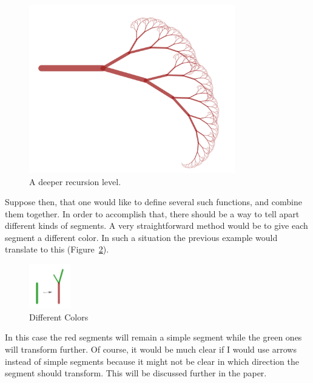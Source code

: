         \begin{figure}[ht]
            \caption{\label{simple03} A deeper recursion level.}
            \centering
            \includegraphics[width=0.8\textwidth]{img/simple03.png}
        \end{figure}

        \FloatBarrier

        Suppose then, that one would like to define several such functions, and combine them together.
        In order to accomplish that, there should be a way to tell apart different kinds of segments.
        A very straightforward method would be to give each segment a different color.
        In such a situation the previous example would translate to this (Figure~\ref{med01}).

        \begin{figure}[ht]
            \caption{\label{med01} Different Colors}
            \centering
            \includegraphics[width=0.16\textwidth]{img/med01.png}
        \end{figure}

        \FloatBarrier

        In this case the red segments will remain a simple segment while the green ones will transform further.
        Of course, it would be much clear if I would use arrows instead of simple segments because it might not be clear in which direction the segment should transform. 
        This will be discussed further in the paper.

